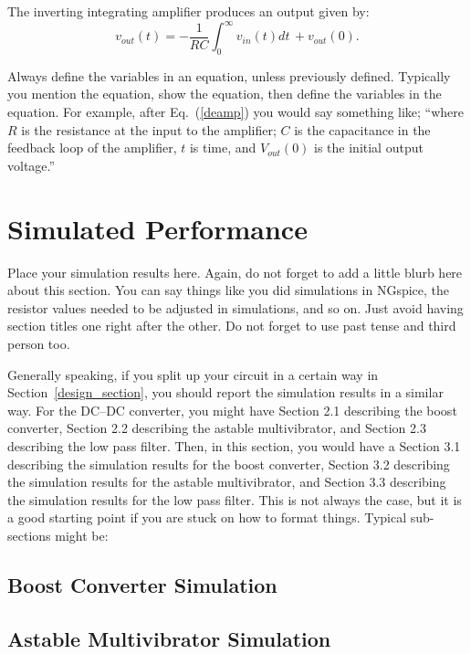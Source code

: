 \documentclass[11pt]{article}
\begin{document}
The inverting integrating amplifier produces an output given by:
\begin{equation}
v_{out}(t) = - \frac{1}{RC} \int_0^\infty v_{in}(t) dt \, + v_{out}(0).
\label{deamp}
\end{equation}

Always define the variables in an equation, unless previously defined. Typically you mention the equation, show the equation, then define the variables in the equation.  For example, after Eq.~(\ref{deamp}) you would say something like; ``where $R$ is the resistance at the input to the amplifier; $C$ is the capacitance in the feedback loop of the amplifier, $t$ is time, and $V_{out}(0)$ is the initial output voltage.''


\section{Simulated Performance}
\label{sim_section}

Place your simulation results here. Again, do not forget to add a little blurb here about this section. You can say things like you did simulations in NGspice, the resistor values needed to be adjusted in simulations, and so on. Just avoid having section titles one right after the other. Do not forget to use past tense and third person too. 

Generally speaking, if you split up your circuit in a certain way in Section~\ref{design_section}, you should report the simulation results in a similar way. For the DC--DC converter, you might have Section 2.1 describing the boost converter, Section 2.2 describing the astable multivibrator, and Section 2.3 describing the low pass filter. Then, in this section, you would have a Section 3.1 describing the simulation results for the boost converter, Section 3.2 describing the simulation results for the astable multivibrator, and Section 3.3 describing the simulation results for the low pass filter. This is not always the case, but it is a good starting point if you are stuck on how to format things. Typical sub-sections might be:

\subsection{Boost Converter Simulation}

\subsection{Astable Multivibrator Simulation}
\end{document}
